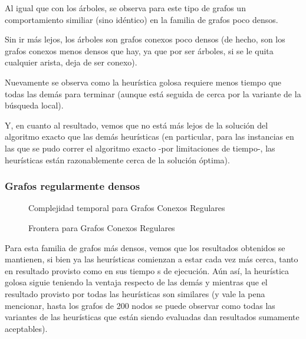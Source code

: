 \bigskip

\par Al igual que con los \'arboles, se observa para este tipo
    de grafos un comportamiento similiar (sino id\'entico) en la
    familia de grafos poco densos.

\par Sin ir m\'as lejos, los \'arboles son grafos conexos poco densos
    (de hecho, son los grafos conexos menos densos que hay, ya que
    por ser \'arboles, si se le quita cualquier arista, deja de ser
    conexo).

\par Nuevamente se observa como la heur\'istica golosa requiere menos
    tiempo que todas las dem\'as para terminar (aunque est\'a seguida
    de cerca por la variante de la b\'usqueda local).

\par Y, en cuanto al resultado, vemos que no est\'a m\'as lejos de
    la soluci\'on del algoritmo exacto que las dem\'as heur\'isticas
    (en particular, para las instancias en las que se pudo correr
    el algoritmo exacto -por limitaciones de tiempo-, las heur\'isticas
    est\'an razonablemente cerca de la soluci\'on \'optima).

\subsubsection{Grafos regularmente densos}
\begin{figure}[H]
    \centering
    \fontsize{7}{10}\selectfont
    \resizebox{0.80\textwidth}{!}{}
    \caption{Complejidad temporal para Grafos Conexos Regulares}
\end{figure}

\begin{figure}[H]
    \centering
    \fontsize{7}{10}\selectfont
    \resizebox{0.80\textwidth}{!}{}
    \caption{Frontera para Grafos Conexos Regulares}
\end{figure}


\bigskip

\par Para esta familia de grafos m\'as densos, vemos que los
    resultados obtenidos se mantienen, si bien ya las heur\'isticas
    comienzan a estar cada vez m\'as cerca, tanto en resultado provisto
    como en sus tiempo s de ejecuci\'on. A\'un as\'i, la heur\'istica 
    golosa siguie teniendo la ventaja respecto de las dem\'as y mientras
    que el resultado provisto por todas las heur\'isticas son similares
    (y vale la pena mencionar, hasta los grafos de 200 nodos se
    puede observar como todas las variantes de las heur\'isticas
    que est\'an siendo evaluadas dan resultados sumamente aceptables).

